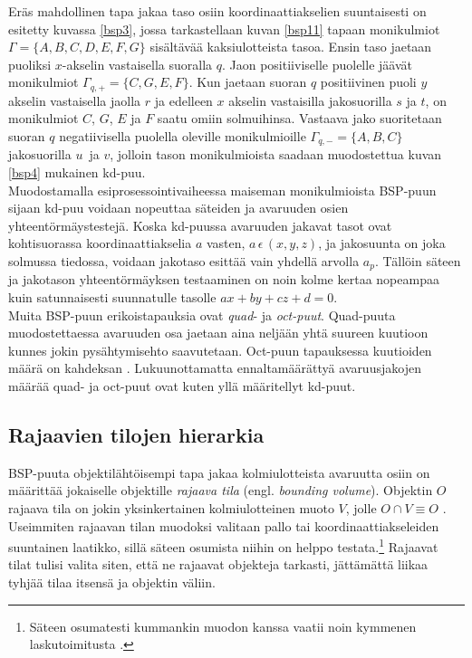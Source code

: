 \documentclass[a4paper, 12pt, titlepage]{article}
\begin{document}
Eräs mahdollinen tapa jakaa taso osiin koordinaattiakselien suuntaisesti on esitetty kuvassa \ref{bsp3}, jossa tarkastellaan kuvan \ref{bsp11} tapaan monikulmiot $\Gamma=\{A,B,C,D,E,F,G\}$ sisältävää kaksiulotteista tasoa. Ensin taso jaetaan puoliksi $x$-akselin vastaisella suoralla $q$. Jaon positiiviselle puolelle jäävät monikulmiot $\Gamma_{q,+} = \{C,G,E,F\}$. Kun jaetaan suoran $q$ positiivinen puoli $y$ akselin vastaisella jaolla $r$ ja edelleen $x$ akselin vastaisilla jakosuorilla $s$ ja $t$, on monikulmiot $C$, $G$, $E$ ja $F$ saatu omiin solmuihinsa. Vastaava jako suoritetaan suoran $q$ negatiivisella puolella oleville monikulmioille $\Gamma_{q,-} = \{A,B,C\}$ jakosuorilla $u$ ja $v$, jolloin tason monikulmioista saadaan muodostettua kuvan \ref{bsp4} mukainen kd-puu.\\ 

Muodostamalla esiprosessointivaiheessa maiseman monikulmioista BSP-puun sijaan kd-puu voidaan nopeuttaa säteiden ja avaruuden osien yhteentörmäystestejä. Koska kd-puussa avaruuden jakavat tasot ovat kohtisuorassa koordinaattiakselia $a$ vasten, $a\,\epsilon\,(x, y, z)$, ja jakosuunta on joka solmussa tiedossa, voidaan jakotaso esittää vain yhdellä arvolla $a_p$. Tällöin säteen ja jakotason yhteentörmäyksen testaaminen on noin kolme kertaa nopeampaa kuin satunnaisesti suunnatulle tasolle $ax + by + cz + d = 0$. \citep[.]{havran}\\



Muita BSP-puun erikoistapauksia ovat \emph{quad}- ja \emph{oct-puut}. Quad-puuta muodostettaessa avaruuden osa jaetaan aina neljään yhtä suureen kuutioon kunnes jokin pysähtymisehto saavutetaan. Oct-puun tapauksessa kuutioiden määrä on kahdeksan \citep[.]{samet}. Lukuunottamatta ennaltamäärättyä avaruusjakojen määrää quad- ja oct-puut ovat kuten yllä määritellyt kd-puut.

\subsection{Rajaavien tilojen hierarkia}

BSP-puuta objektilähtöisempi tapa jakaa kolmiulotteista avaruutta osiin on määrittää jokaiselle objektille \emph{rajaava tila} (engl. \emph{bounding volume}). Objektin $O$ rajaava tila on jokin yksinkertainen kolmiulotteinen muoto $V$, jolle $O \cap V \equiv O$ \citep{havran}. Useimmiten rajaavan tilan muodoksi valitaan pallo tai koordinaattiakseleiden suuntainen laatikko, sillä säteen osumista niihin on helppo testata.\footnote{Säteen osumatesti kummankin muodon kanssa vaatii noin kymmenen laskutoimitusta \citep{goldsmith}.} Rajaavat tilat tulisi valita siten, että ne rajaavat objekteja tarkasti, jättämättä liikaa tyhjää tilaa itsensä ja objektin väliin. \citep{hughes} \\
\end{document}
